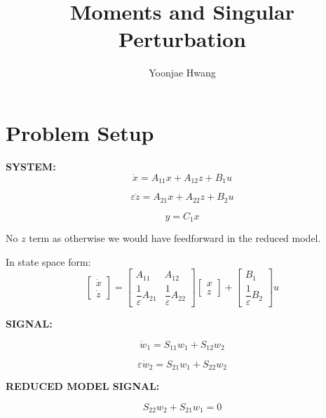 \documentclass{article}
\title{Moments and Singular Perturbation}
\author{Yoonjae Hwang}
\begin{document}
\maketitle
\section{Problem Setup}

\textbf{SYSTEM: } 
\begin{equation}
    \dot{x} = A_{11} x + A_{12} z + B_1 u
\end{equation}

\begin{equation}
    \varepsilon \dot{z} = A_{21} x + A_{22} z + B_2 u
\end{equation}

\begin{equation}
    y = C_1 x
\end{equation}

No $z$ term as otherwise we would have feedforward in the reduced model. 

In state space form:
\begin{equation}
\begin{bmatrix}
\dot{x} \\
\dot{z}
\end{bmatrix}
=
\begin{bmatrix}
A_{11} & A_{12} \\
\dfrac{1}{\varepsilon} A_{21} & \dfrac{1}{\varepsilon} A_{22}
\end{bmatrix}
\begin{bmatrix}
x \\
z
\end{bmatrix}
+
\begin{bmatrix}
B_{1} \\
\dfrac{1}{\varepsilon} B_{2}
\end{bmatrix} u
\label{eq:compact_system}
\end{equation}

\textbf{SIGNAL:}

\begin{equation}
    \dot{w}_1 = S_{11} w_1 + S_{12} w_2
\end{equation}

\begin{equation}
    \varepsilon \dot{w}_2 = S_{21} w_1 + S_{22} w_2
\end{equation}


\textbf{REDUCED MODEL SIGNAL:} 

\begin{equation}
S_{22} w_2 + S_{21} w_1 = 0
\end{equation}
\end{document}
